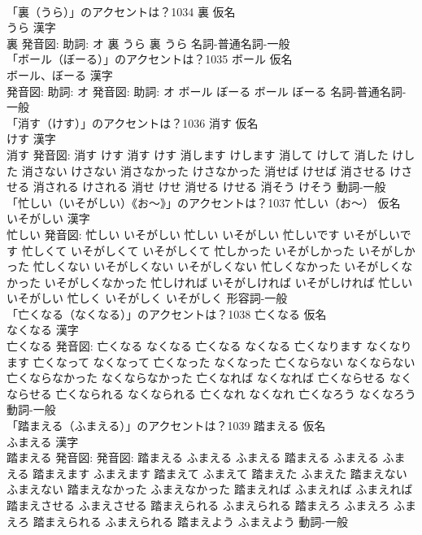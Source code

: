 \documentclass[8pt]{extreport}
\begin{document}
\begin{CJK}{UTF8}{min}
\\	「裏（うら）」のアクセントは？1034	裏 仮名　
\\	うら 漢字　
\\	裏 発音図: 助詞: オ	裏 うら		裏 うら				名詞-普通名詞-一般 
\\	「ボール（ぼーる）」のアクセントは？1035	ボール 仮名　
\\	ボール、ぼーる 漢字　
\\	発音図: 助詞: オ 発音図: 助詞: オ	ボール ぼーる		ボール ぼーる				名詞-普通名詞-一般 
\\	「消す（けす）」のアクセントは？1036	消す 仮名　
\\	けす 漢字　
\\	消す 発音図:	消す けす		消す けす 消します けします 消して けして 消した けした 消さない けさない 消さなかった けさなかった 消せば けせば 消させる けさせる 消される けされる 消せ けせ 消せる けせる 消そう けそう				動詞-一般 
\\	「忙しい（いそがしい）《お〜》」のアクセントは？1037	忙しい（お〜） 仮名　
\\	いそがしい 漢字　
\\	忙しい 発音図:	忙しい いそがしい		忙しい いそがしい 忙しいです いそがしいです 忙しくて いそがしくて いそがしくて 忙しかった いそがしかった いそがしかった 忙しくない いそがしくない いそがしくない 忙しくなかった いそがしくなかった いそがしくなかった 忙しければ いそがしければ いそがしければ 忙しい いそがしい 忙しく いそがしく いそがしく				形容詞-一般 
\\	「亡くなる（なくなる）」のアクセントは？1038	亡くなる 仮名　
\\	なくなる 漢字　
\\	亡くなる 発音図:	亡くなる なくなる		亡くなる なくなる 亡くなります なくなります 亡くなって なくなって 亡くなった なくなった 亡くならない なくならない 亡くならなかった なくならなかった 亡くなれば なくなれば 亡くならせる なくならせる 亡くなられる なくなられる 亡くなれ なくなれ 亡くなろう なくなろう				動詞-一般 
\\	「踏まえる（ふまえる）」のアクセントは？1039	踏まえる 仮名　
\\	ふまえる 漢字　
\\	踏まえる 発音図: 発音図:	踏まえる ふまえる ふまえる		踏まえる ふまえる ふまえる 踏まえます ふまえます 踏まえて ふまえて 踏まえた ふまえた 踏まえない ふまえない 踏まえなかった ふまえなかった 踏まえれば ふまえれば ふまえれば 踏まえさせる ふまえさせる 踏まえられる ふまえられる 踏まえろ ふまえろ ふまえろ 踏まえられる ふまえられる 踏まえよう ふまえよう				動詞-一般 

\end{CJK}
\end{document}
